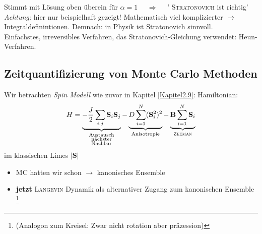 \documentclass[12pt]{article}
\begin{document}
Stimmt mit Lösung oben überein für $ \alpha = 1$ $ \quad \Rightarrow \quad $ ' \textsc{Stratonovich} ist richtig' \\
\textit{Achtung:} hier nur beispielhaft gezeigt! Mathematisch viel komplizierter $\to$ Integraldefinintionen. Demnach: in Physik ist Stratonovich sinnvoll. \\

Einfachstes, irreversibles Verfahren, das Stratonovich-Gleichung verwendet: Heun-Verfahren. 

\subsection{Zeitquantifizierung von Monte Carlo Methoden} %
 Wir betrachten  \textit{ Spin Modell }wie zuvor in Kapitel  \ref{Kapitel2.9}:
 Hamiltonian: \begin{align}
 H =\underbrace{ -\frac{J}{2} \sum_{i,j} \mathbf{S}_i \mathbf{S}_j }_{ \substack{ \text{Austausch} \\ \text{nächster} \\ \text{Nachbar}}}- \underbrace{ D \sum_{i=1}^N (\mathbf{S}_i^2)^2 }_\text{Anisotropie}- \underbrace{\mathbf{B} \sum_{i=1}^N \mathbf{S}_i }_\text{\textsc{Zeeman}}
 \end{align}
 im klassischen Limes $\vert \mathbf{S} \vert $ 
 \begin{itemize}
 \item MC hatten wir schon $\to$ kanonisches Ensemble
 \item \textbf{jetzt} \textsc{Langevin} Dynamik als alternativer Zugang zum kanonischen Ensemble \footnote{(Analogon zum Kreisel: Zwar nicht rotation aber präzession)}
  \end{itemize}
\end{document}
